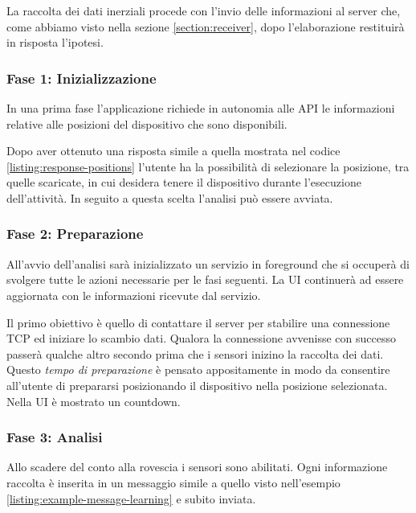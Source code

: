 La raccolta dei dati inerziali procede con l'invio delle informazioni al server che, 
come abbiamo visto nella sezione \ref{section:receiver}, dopo l'elaborazione restituirà in risposta l'ipotesi.


\subsubsection{Fase 1: Inizializzazione}
In una prima fase l'applicazione richiede in autonomia alle API le informazioni relative alle posizioni del dispositivo 
che sono disponibili.

Dopo aver ottenuto una risposta simile a quella mostrata nel codice \ref{listing:response-positions}  
l'utente ha la possibilità di selezionare la posizione, tra quelle scaricate, in cui desidera tenere 
il dispositivo durante l'esecuzione dell'attività. In seguito a questa scelta l'analisi può essere avviata.

\subsubsection{Fase 2: Preparazione}
All'avvio dell'analisi sarà inizializzato un servizio in foreground \cite{services} che si occuperà di svolgere tutte le azioni 
necessarie per le fasi seguenti. La UI continuerà ad essere aggiornata con le informazioni ricevute dal servizio.

Il primo obiettivo è quello di contattare il server per stabilire una connessione TCP ed iniziare lo scambio dati. 
Qualora la connessione avvenisse con successo passerà qualche altro secondo prima che i sensori inizino la raccolta dei dati.
Questo \textit{tempo di preparazione} è pensato appositamente in modo da consentire all'utente 
di prepararsi posizionando il dispositivo nella posizione selezionata. Nella UI è mostrato un countdown.

\subsubsection{Fase 3: Analisi}
Allo scadere del conto alla rovescia i sensori sono abilitati. 
Ogni informazione raccolta è inserita in un messaggio simile a quello visto 
nell'esempio \ref{listing:example-message-learning} e subito inviata.

